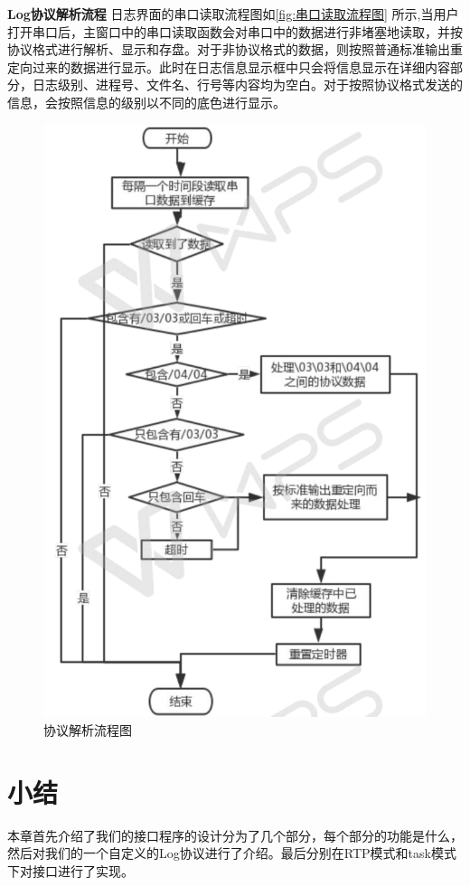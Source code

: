 \textbf{Log协议解析流程}
	日志界面的串口读取流程图如\autoref{fig:串口读取流程图} 所示,当用户打开串口后，主窗口中的串口读取函数会对串口中的数据进行非堵塞地读取，并按协议格式进行解析、显示和存盘。对于非协议格式的数据，则按照普通标准输出重定向过来的数据进行显示。此时在日志信息显示框中只会将信息显示在详细内容部分，日志级别、进程号、文件名、行号等内容均为空白。对于按照协议格式发送的信息，会按照信息的级别以不同的底色进行显示。
\begin{figure}[!h]
\centering
\includegraphics[width=.6\textwidth]{./graphics/LogTTYRead.pdf}
\caption{协议解析流程图}\label{fig:串口读取流程图}
\end{figure}

\section{小结}
	本章首先介绍了我们的接口程序的设计分为了几个部分，每个部分的功能是什么，然后对我们的一个自定义的Log协议进行了介绍。最后分别在RTP模式和task模式下对接口进行了实现。	
